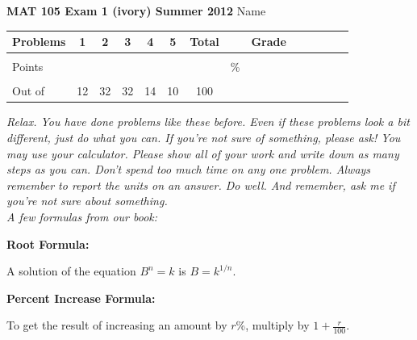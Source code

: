 \documentclass[12pt]{article}
\begin{document}
\textbf{MAT 105 Exam 1 (ivory) Summer 2012} \hspace{.4in} {\large Name} \hrulefill

\begin{center}

\begin{tabular}
{|l|c|c|c|c|c|c|c|c|c|c|c|c|c|} \hline

 Problems & \hspace{5 pt} 1 \hspace{5 pt}  & \hspace{5 pt} 2 \hspace{5 pt} & \hspace{5 pt} 3 \hspace{5 pt} & \hspace{5 pt} 4 \hspace{5 pt} & \hspace{5 pt} 5 \hspace{5 pt} & \hspace{5 pt} Total  \hspace{5 pt} & &  \hspace{5 pt} Grade \hspace{5 pt}  \\ \hline
&&&&&&&&\\  
Points &&&&&&&    \hspace{.8in}\% &  \\ 
&&&&&&&& \\  \hline
Out of & 12 & 32 & 32 & 14 & 10 &100 & & \\ \hline

\end {tabular}

\end{center}

\vspace{.2in}

 \emph{Relax.  You have done problems like these before.  Even if these problems look a bit different, just do what you can.  If you're not sure of something, please ask! You may use your calculator.  Please show all of your work and write down as many steps as you can.  Don't spend too much time on any one problem.  Always remember to report the units on an answer. Do well.  And remember, ask me if you're not sure about something.} \\

\vspace{.5in} 
\noindent \emph{A few formulas from our book:}
\begin{center}

\textbf{Root Formula:} 

A solution of the equation $B^n=k$ is $B=k^{1/n}$.

\vspace{.2in} 

\textbf{Percent Increase Formula:} 

To get the result of increasing an amount by $r$\%, multiply by $1 + \frac{r}{100}$.

\end{center}
\end{document}

